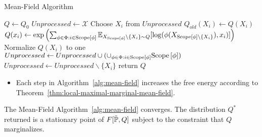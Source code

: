 \begin{frame}{Mean-Field Algorithm}
\begin{algorithm}[H]
\label{alg:mean-field}
\caption{Mean-Field Algorithm}
\pause
$Q \leftarrow Q_0$\;
\pause
$Unprocessed \leftarrow \mathcal{X}$\;
\pause
{}
{
    Choose $X_i$ from $Unprocessed$\;
    \pause
    $Q_{old}(X_i) \leftarrow Q(X_i)$\;
    \pause
    {
        $Q(x_i) \leftarrow \exp\left( \sum_{\phi \in \Phi : i \in \Scope[\phi]} \E_{X_{\Scope[\phi]} \backslash \{X_i\} \sim Q}[\log(\phi(X_{\Scope[\phi] \backslash \{X_i\}}), x_i)] \right)$\;
    }
    \pause
    Normalize $Q(X_i)$ to one\;
    \pause
    {
        $Unprocessed \leftarrow Unprocessed \cup (\cup_{\phi \in \Phi: i \in \Scope[\phi]} \Scope[\phi])$\;
    }
    \pause
    $Unprocessed \leftarrow Unprocessed \backslash \{X_i\}$\;
}
return $Q$\;
\end{algorithm}
\begin{itemize}
\pause \item Each step in Algorithm~\ref{alg:mean-field} increases the free energy according to Theorem~\ref{thm:local-maximal-marginal-mean-field}.
\end{itemize}

    \pause
    \begin{theorem}
    The Mean-Field Algorithm~\ref{alg:mean-field} converges. The distribution $Q^*$ returned is a stationary point of $F[\tilde{\Pb},Q]$ subject to the constraint that $Q$ marginalizes.
    \end{theorem}
\end{frame}

